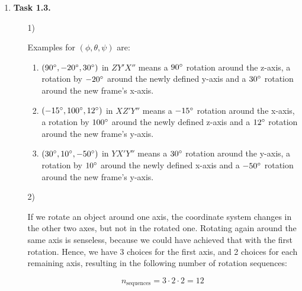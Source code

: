 \documentclass[a4paper,11pt]{article}
\begin{document}
\begin {enumerate}
\begin{enumerate}
                \end{tikzpicture}
                $$

        \end{enumerate}

\item[\textbf{Task 1.3.}]

    \begin{enumerate}
        \item[1)]

            Examples for $(\phi, \theta, \psi)$ are:

            \begin{enumerate}
                \item $(90\degree, -20\degree, 30\degree)$ in $ZY'X''$ means a $90\degree$ rotation around the z-axis, a rotation by $-20\degree$ around the newly defined y-axis and a $30\degree$ rotation around the new frame's x-axis.
                \item $(-15\degree, 100\degree, 12\degree)$ in $XZ'Y''$ means a $-15\degree$ rotation around the x-axis, a rotation by $100\degree$ around the newly defined z-axis and a $12\degree$ rotation around the new frame's y-axis.
                \item $(30\degree, 10\degree, -50\degree)$ in $YX'Y''$ means a $30\degree$ rotation around the y-axis, a rotation by $10\degree$ around the newly defined x-axis and a $-50\degree$ rotation around the new frame's y-axis.
            \end{enumerate}

        \item[2)]

            If we rotate an object around one axis, the coordinate system
            changes in the other two axes, but not in the rotated one. Rotating
            again around the same axis is senseless, because we could have
            achieved that with the first rotation. Hence, we have 3 choices for
            the first axis, and 2 choices for each remaining axis, resulting in
            the following number of rotation sequences:

            $$n_{\text{sequences}} = 3 \cdot 2 \cdot 2 = 12$$

    \end{enumerate}

\end {enumerate}
\end{document}
